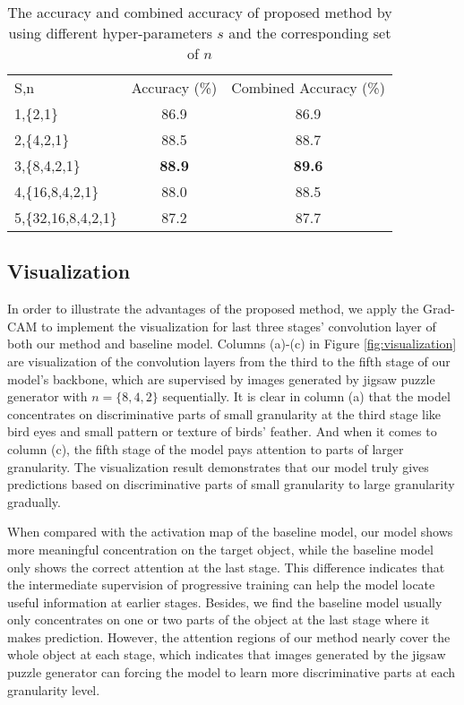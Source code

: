 \documentclass{llncs}
\begin{document}
\setlength{\tabcolsep}{4pt}
\begin{table}[!t]
\begin{center}
\caption{The accuracy and combined accuracy of proposed method by using different hyper-parameters $s$ and the corresponding set of $n$}
\label{table:5stage_wJPG}
\begin{tabular}{lcc}
\hline\noalign{\smallskip}
S,n & Accuracy (\%) & Combined Accuracy (\%)\\
\noalign{\smallskip}
\hline
\noalign{\smallskip}
1,\{2,1\} & 86.9 & 86.9\\
2,\{4,2,1\} & 88.5 & 88.7\\
3,\{8,4,2,1\} & {\bf 88.9} & {\bf 89.6}\\
4,\{16,8,4,2,1\} & 88.0 & 88.5\\
5,\{32,16,8,4,2,1\} & 87.2 & 87.7\\
\hline
\end{tabular}
\end{center}
\end{table}
\setlength{\tabcolsep}{1.4pt}



\subsection{Visualization}\label{ssec:visualization}

In order to illustrate the advantages of the proposed method, we apply the Grad-CAM to implement the visualization for last three stages' convolution layer of both our method and baseline model. Columns (a)-(c) in Figure \ref{fig:visualization} are visualization of the convolution layers from the third to the fifth stage of our model's backbone, which are supervised by images generated by jigsaw puzzle generator with $n=\{8,4,2\}$ sequentially. It is clear in column (a) that the model concentrates on discriminative parts of small granularity at the third stage like bird eyes and small pattern or texture of birds' feather. And when it comes to column (c), the fifth stage of the model pays attention to parts of larger granularity. The visualization result demonstrates that our model truly gives predictions based on discriminative parts of small granularity to large granularity gradually.

When compared with the activation map of the baseline model, our model shows more meaningful concentration on the target object, while the baseline model only shows the correct attention at the last stage. This difference indicates that the intermediate supervision of progressive training can help the model locate useful information at earlier stages. Besides, we find the baseline model usually only concentrates on one or two parts of the object at the last stage where it makes prediction. However, the attention regions of our method nearly cover the whole object at each stage, which indicates that images generated by the jigsaw puzzle generator can forcing the model to learn more discriminative parts at each granularity level.
\end{document}
